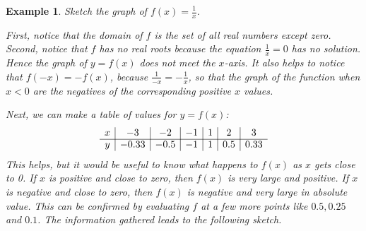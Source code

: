 \documentclass[11pt]{book}               %
\newtheorem{example}{Example}
\begin{document}
\begin{example}
Sketch the graph of $f(x) = \frac{1}{x}$.

\normalfont
First, notice that the domain of $f$ is the set of all real numbers except zero.
Second, notice that $f$ has no real roots because the equation $\frac{1}{x} = 0$ has no solution.
Hence the graph of $y = f(x)$ does not meet the $x$-axis.
It also helps to notice that $f(-x) = -f(x)$, because $\frac{1}{-x} = -\frac{1}{x}$, so that the graph of the function when $x < 0$ are the negatives of the corresponding positive $x$ values.

Next, we can make a table of values for $y = f(x)$:
$$
\begin{array}{c|c|c|c|c|c|c}
x & -3 & -2 & -1  & 1 & 2 & 3 \\
\cline{1-7}
y & -0.33 & -0.5 & -1 & 1 & 0.5 & 0.33\\
\end{array}
$$
This helps, but it would be useful to know what happens to $f(x)$ as $x$ gets close to 0.
If $x$ is positive and close to zero, then $f(x)$ is very large and positive.
If $x$ is negative and close to zero, then $f(x)$ is negative and very large in absolute value.
This can be confirmed by evaluating $f$ at a few more points like $0.5, 0.25$ and $0.1$.
The information gathered leads to the following sketch.


\begin{center}
\end{center}





\end{example}
\end{document}

